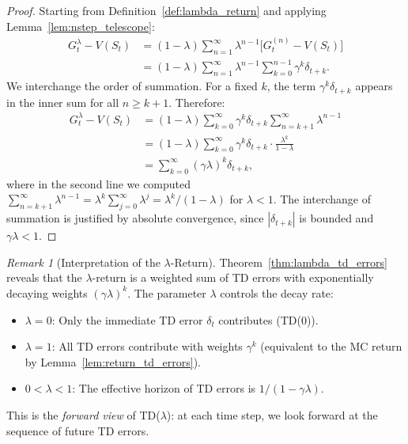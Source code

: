 \documentclass[11pt,a4paper]{article}
\theoremstyle{definition}
\theoremstyle{plain}
\theoremstyle{remark}
\newtheorem{remark}{Remark}[section]
\begin{document}
\begin{proof}
Starting from Definition~\ref{def:lambda_return} and applying Lemma~\ref{lem:nstep_telescope}:
\begin{align}
    G_t^\lambda - V(S_t)
    &= (1-\lambda) \sum_{n=1}^{\infty} \lambda^{n-1} \bigl[G_t^{(n)} - V(S_t)\bigr] \nonumber\\
    &= (1-\lambda) \sum_{n=1}^{\infty} \lambda^{n-1} \sum_{k=0}^{n-1} \gamma^k \delta_{t+k}. \label{eq:lambda_step1}
\end{align}
We interchange the order of summation. For a fixed $k$, the term $\gamma^k \delta_{t+k}$ appears in the inner sum for all $n \geq k+1$. Therefore:
\begin{align}
    G_t^\lambda - V(S_t)
    &= (1-\lambda) \sum_{k=0}^{\infty} \gamma^k \delta_{t+k} \sum_{n=k+1}^{\infty} \lambda^{n-1} \nonumber\\
    &= (1-\lambda) \sum_{k=0}^{\infty} \gamma^k \delta_{t+k} \cdot \frac{\lambda^k}{1-\lambda} \nonumber\\
    &= \sum_{k=0}^{\infty} (\gamma\lambda)^k \delta_{t+k}, \label{eq:lambda_final}
\end{align}
where in the second line we computed $\sum_{n=k+1}^{\infty} \lambda^{n-1} = \lambda^k \sum_{j=0}^{\infty} \lambda^j = \lambda^k/(1-\lambda)$ for $\lambda < 1$. The interchange of summation is justified by absolute convergence, since $|\delta_{t+k}|$ is bounded and $\gamma\lambda < 1$.
\end{proof}

\begin{remark}[Interpretation of the $\lambda$-Return]
\label{rem:lambda_interpretation}
Theorem~\ref{thm:lambda_td_errors} reveals that the $\lambda$-return is a weighted sum of TD errors with exponentially decaying weights $(\gamma\lambda)^k$. The parameter $\lambda$ controls the decay rate:
\begin{itemize}[nosep]
    \item $\lambda = 0$: Only the immediate TD error $\delta_t$ contributes (TD(0)).
    \item $\lambda = 1$: All TD errors contribute with weights $\gamma^k$ (equivalent to the MC return by Lemma~\ref{lem:return_td_errors}).
    \item $0 < \lambda < 1$: The effective horizon of TD errors is $1/(1-\gamma\lambda)$.
\end{itemize}
This is the \emph{forward view} of TD($\lambda$): at each time step, we look forward at the sequence of future TD errors.
\end{remark}
\end{document}
